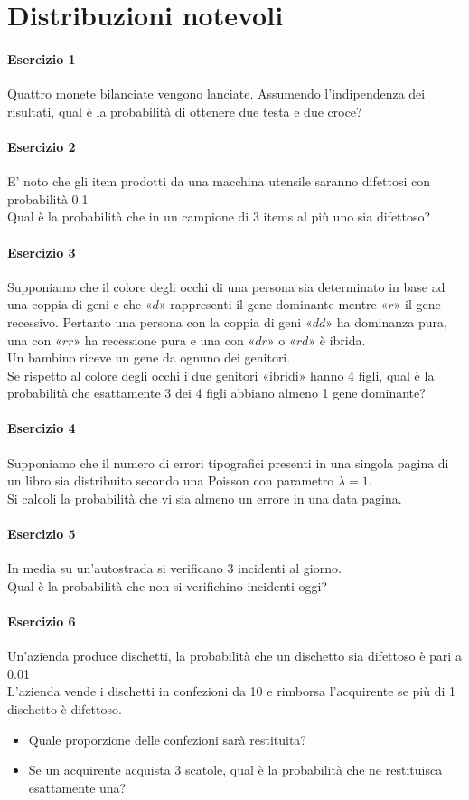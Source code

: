 \documentclass[12pt]{article}
\begin{document}
    \section{Distribuzioni notevoli}
    \paragraph{Esercizio 1} 
    Quattro monete bilanciate vengono lanciate. Assumendo l’indipendenza dei risultati, qual è la probabilità di ottenere due testa e due croce?
    \paragraph{Esercizio 2}
    E’ noto che gli item prodotti da una macchina utensile saranno difettosi con probabilità 0.1\\
    Qual è la probabilità che in un campione di 3 items al più uno sia difettoso?
    \paragraph{Esercizio 3}
    Supponiamo che il colore degli occhi di una persona sia determinato in base ad una coppia di geni e che «$d$» rappresenti il gene dominante mentre «$r$» il gene recessivo. Pertanto una persona con la coppia di geni «$dd$» ha dominanza pura, una con «$rr$» ha recessione pura e una con «$dr$» o «$rd$» è ibrida.
    \\Un bambino riceve un gene da ognuno dei genitori.
    \\Se rispetto al colore degli occhi i due genitori «ibridi» hanno 4 figli, qual è la probabilità che esattamente 3 dei 4 figli abbiano almeno 1 gene dominante?
    \paragraph{Esercizio 4}
    Supponiamo che il numero di errori tipografici presenti in una singola pagina di un libro sia distribuito secondo una Poisson con parametro $\lambda = 1$.
    \\Si calcoli la probabilità che vi sia almeno un errore in una data pagina.
    \paragraph{Esercizio 5}
    In media su un’autostrada si verificano 3 incidenti al giorno.
    \\Qual è la probabilità che non si verifichino incidenti oggi?
    \paragraph{Esercizio 6}
    Un’azienda produce dischetti, la probabilità che un dischetto sia difettoso è pari a 0.01
    \\L’azienda vende i dischetti in confezioni da 10 e rimborsa l’acquirente se più di 1 dischetto è difettoso.
    \begin{itemize}
        \item Quale proporzione delle confezioni sarà restituita?
        \item Se un acquirente acquista 3 scatole, qual è la probabilità che ne restituisca esattamente una?
    \end{itemize}
    \newpage
\end{document}

